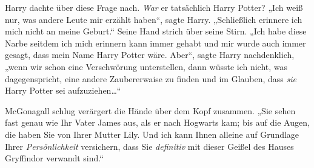 Harry dachte über diese Frage nach. \emph{War} er tatsächlich Harry Potter? „Ich weiß nur, was andere Leute mir erzählt haben“, sagte Harry. „Schließlich erinnere ich mich nicht an meine Geburt.“ Seine Hand strich über seine Stirn. „Ich habe diese Narbe seitdem ich mich erinnern kann immer gehabt und mir wurde auch immer gesagt, dass mein Name Harry Potter wäre. Aber“, sagte Harry nachdenklich, „wenn wir schon eine Verschwörung unterstellen, dann wüsste ich nicht, was dagegenspricht, eine andere Zaubererwaise zu finden und im Glauben, dass \emph{sie} Harry Potter sei aufzuziehen…“

McGonagall schlug verärgert die Hände über dem Kopf zusammen. „Sie sehen fast genau wie Ihr Vater James aus, als er nach Hogwarts kam; bis auf die Augen, die haben Sie von Ihrer Mutter Lily. Und ich kann Ihnen alleine auf Grundlage Ihrer \emph{Persönlichkeit} versichern, dass Sie \emph{definitiv} mit dieser Geißel des Hauses Gryffindor verwandt sind.“

